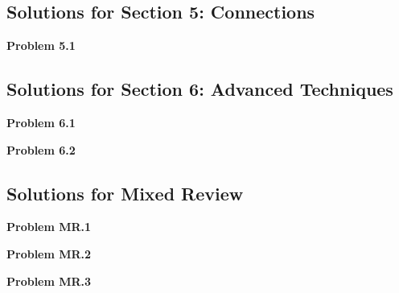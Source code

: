 \documentclass[12pt,letterpaper]{article}
\begin{document}

\subsection{Solutions for Section 5: Connections}

\textbf{Problem 5.1}

\begin{solution}
\end{solution}


\subsection{Solutions for Section 6: Advanced Techniques}

\textbf{Problem 6.1}

\begin{solution}
\end{solution}

\textbf{Problem 6.2}

\begin{solution}
\end{solution}


\subsection{Solutions for Mixed Review}

\textbf{Problem MR.1}

\begin{solution}
\end{solution}

\textbf{Problem MR.2}

\begin{solution}
\end{solution}

\textbf{Problem MR.3}

\begin{solution}
\end{solution}

\end{document}

